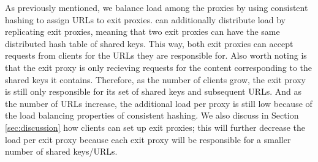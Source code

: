 As previously mentioned, we balance load among the proxies by using consistent hashing to assign URLs to 
exit proxies.  \system{} can additionally distribute load by replicating exit proxies, meaning that two exit proxies can 
have the same distributed hash table of shared keys.  This way, both exit proxies can accept requests from clients for 
the URLs they are responsible for.  Also worth noting is that the exit proxy is only recieving requests for the content 
corresponding to the shared keys it contains.  Therefore, as the number of clients grow, the exit proxy is still only responsible 
for its set of shared keys and subsequent URLs.  And as the number of URLs increase, the additional load per proxy is 
still low because of the load balancing properties of consistent hashing.  We also discuss in Section \ref{sec:discussion} how 
clients can set up exit proxies; this will further decrease the load per exit proxy because each exit proxy will be responsible 
for a smaller number of shared keys/URLs.
